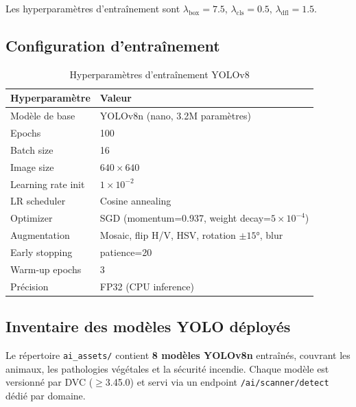 Les hyperparamètres d'entraînement sont $\lambda_\text{box} = 7.5$,
$\lambda_\text{cls} = 0.5$, $\lambda_\text{dfl} = 1.5$.

\subsection{Configuration d'entraînement}

\begin{table}[H]
\centering
\caption{Hyperparamètres d'entraînement YOLOv8}
\label{tab:yolo_hp}
\begin{tabular}{ll}
\toprule
\textbf{Hyperparamètre} & \textbf{Valeur} \\
\midrule
Modèle de base      & YOLOv8n (nano, 3.2M paramètres) \\
Epochs              & 100 \\
Batch size          & 16 \\
Image size          & $640 \times 640$ \\
Learning rate init  & $1\times10^{-2}$ \\
LR scheduler        & Cosine annealing \\
Optimizer           & SGD (momentum=0.937, weight decay=$5\times10^{-4}$) \\
Augmentation        & Mosaic, flip H/V, HSV, rotation $\pm15°$, blur \\
Early stopping      & patience=20 \\
Warm-up epochs      & 3 \\
Précision           & FP32 (CPU inference) \\
\bottomrule
\end{tabular}
\end{table}

\subsection*{Inventaire des modèles YOLO déployés}

Le répertoire \texttt{ai\_assets/} contient \textbf{8 modèles YOLOv8n} entraînés,
couvrant les animaux, les pathologies végétales et la sécurité incendie.
Chaque modèle est versionné par DVC ($\geq$3.45.0) et servi via un endpoint
\texttt{/ai/scanner/detect} dédié par domaine.

